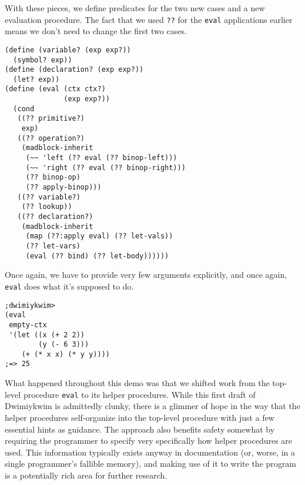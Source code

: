 \documentclass[11pt]{article}
\begin{document}
With these pieces, we define predicates for the two new cases
and a new evaluation procedure.
The fact that we used \texttt{??} for the \texttt{eval} applications earlier
means we don't need to change the first two cases.
\begin{Verbatim}
(define (variable? (exp exp?))
  (symbol? exp))
(define (declaration? (exp exp?))
  (let? exp))
(define (eval (ctx ctx?)
              (exp exp?))
  (cond
   ((?? primitive?)
    exp)
   ((?? operation?)
    (madblock-inherit
     (~~ 'left (?? eval (?? binop-left)))
     (~~ 'right (?? eval (?? binop-right)))
     (?? binop-op)
     (?? apply-binop)))
   ((?? variable?)
    (?? lookup))
   ((?? declaration?)
    (madblock-inherit
     (map (??:apply eval) (?? let-vals))
     (?? let-vars)
     (eval (?? bind) (?? let-body))))))
\end{Verbatim}
Once again, we have to provide very few arguments explicitly,
and once again, \texttt{eval} does what it's supposed to do.
\begin{Verbatim}
;dwimiykwim>
(eval
 empty-ctx
 '(let ((x (+ 2 2))
        (y (- 6 3)))
    (+ (* x x) (* y y))))
;=> 25
\end{Verbatim}

What happened throughout this demo was that we shifted work from
the top-level procedure \texttt{eval} to its helper procedures.
While this first draft of Dwimiykwim is admittedly clunky,
there is a glimmer of hope in the way that the helper procedures
self-organize into the top-level procedure
with just a few essential hints as guidance.
The approach also benefits safety somewhat
by requiring the programmer to specify very specifically
how helper procedures are used.
This information typically exists anyway in documentation
(or, worse, in a single programmer's fallible memory),
and making use of it to write the program
is a potentially rich area for further research.
\end{document}
